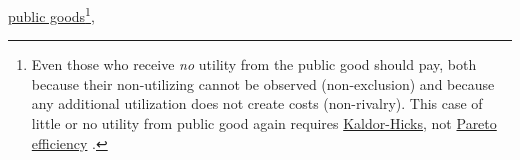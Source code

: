 \begin{description}
	
	
	\hyperref[sec:public-good]{public goods}\footnote{
		Even those who receive \emph{no} utility from the public good should pay, both because their non-utilizing cannot be observed (non-exclusion) and because any additional utilization does not create costs (non-rivalry). This case of little or no utility from public good again requires \hyperref[sec:KaldorHicks]{Kaldor-Hicks}, not \hyperref[sec:Pareto]{Pareto efficiency} \citep{Kaldor1939,Hicks1939}.}, 
		

		

\end{description}
